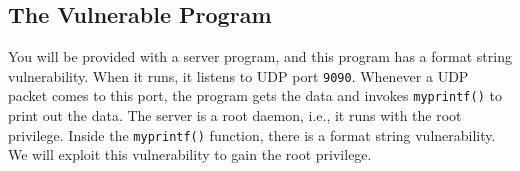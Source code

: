 \subsection{The Vulnerable Program}
\label{subsec:vul}

You will be provided with a server program, and 
this program has a format string vulnerability. 
When it runs, it listens to UDP port
\texttt{9090}. Whenever a UDP packet comes to this port, the program
gets the data and invokes \texttt{myprintf()} to print out the data. 
The server is a root daemon, i.e., it runs with the root privilege. 
Inside the \texttt{myprintf()} function, there is a format string
vulnerability. We will exploit this vulnerability to gain the root
privilege.  


